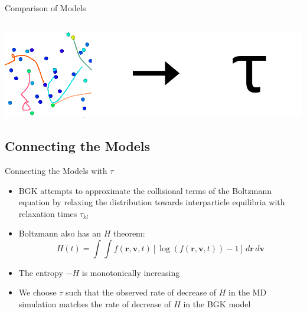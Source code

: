 \documentclass{beamer}
\begin{document}
\begin{frame}{Comparison of Models}
\begin{columns}
\begin{column}{0.55\textwidth}
			\end{column}
		\end{columns}
		\begin{center}
			\includegraphics[height=0.3\textheight]{random_walk.png}
		\end{center}
	\end{frame}
	
	\subsection{Connecting the Models}
	\begin{frame}{Connecting the Models with $\tau$}
		\begin{itemize}
		\item BGK attempts to approximate the collisional terms of the Boltzmann equation by relaxing the distribution towards interparticle equilibria with relaxation times $\tau_{kl}$
		\vspace{1em}
		\item Boltzmann also has an $H$ theorem:
		\[H(t)=\int\int  f(\mathbf{r},\mathbf{v},t)\left[\log\left(f(\mathbf{r},\mathbf{v},t)\right)-1\right]\,d\mathbf{r}\,d\mathbf{v}
		\]\item The entropy $-H$ is monotonically increasing
		\vspace{1em}
		\item We choose $\tau$ such that the observed rate of decrease of $H$ in the MD simulation matches the rate of decrease of $H$ in the BGK model
		\end{itemize}
	\end{frame}
\end{document}
